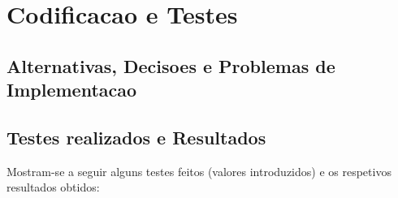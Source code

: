 \chapter{Codificacao e Testes}

\section{Alternativas, Decisoes e Problemas de Implementacao}

\section{Testes realizados e Resultados}
Mostram-se a seguir alguns testes feitos (valores introduzidos) e
os respetivos resultados obtidos:



